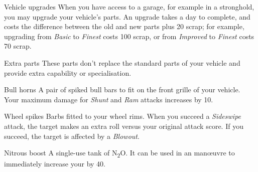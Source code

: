 \begin{abstractsection}{Vehicle upgrades}
  When you have access to a garage, for example in a stronghold, you may upgrade your vehicle's parts. An upgrade takes a day to complete, and costs the difference between the old and new parts plus 20 scrap; for example, upgrading from \emph{Basic} to \emph{Finest} costs 100 scrap, or from \emph{Improved} to \emph{Finest} costs 70 scrap.
\end{abstractsection}

\begin{abstractsection}{Extra parts}
These parts don't replace the standard parts of your vehicle and provide extra capability or specialisation.

\begin{describe}{Bull horns}
  A pair of spiked bull bars to fit on the front grille of your vehicle. Your maximum damage for \emph{Shunt} and \emph{Ram} attacks increases by 10.
\end{describe}

\begin{describe}{Wheel spikes}
  Barbs fitted to your wheel rims. When you succeed a \emph{Sideswipe} attack, the target makes an extra  roll versus your original attack score. If you succeed, the target is affected by a \emph{Blowout}.
\end{describe}

\begin{describe}{Nitrous boost}
  A single-use tank of N\textsubscript{2}O. It can be used in an \duration{\durationInstant} man\oe{}uvre to immediately increase your  by 40.
\end{describe}

\end{abstractsection}
